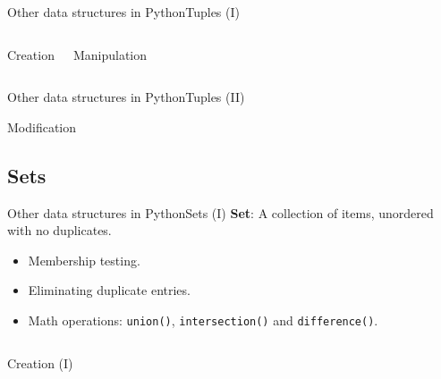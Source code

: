 \documentclass[10pt,compress]{beamer} %
\begin{document}
{\begin{frame}{Other data structures in Python}{Tuples (I)}
	    \begin{columns}
 	   \scriptsize{
		\begin{block}{Creation}
		\vspace{-0.2cm}
		
		\vspace{-0.2cm}
		\end{block}
		}
       \vspace{4cm}
 	   \scriptsize{
		\begin{block}{Manipulation}
		\vspace{-0.2cm}
		
		\vspace{-0.3cm}	
		\end{block}
		}
		\vspace{2.9 cm}

	\end{columns}
\end{frame}

\begin{frame}{Other data structures in Python}{Tuples (II)}
 	  \vspace{-0.2cm}
 	   \tiny{
		\begin{block}{\scriptsize{Modification}}
		
		\vspace{-0.2cm}
		
		\vspace{-0.2cm}
		
		\end{block}
   }
\end{frame}

\subsection{Sets}
\begin{frame}{Other data structures in Python}{Sets (I)}
\vspace{-0.2cm}
	\textbf{Set}: A collection of items, unordered with no duplicates.
		\begin{itemize}
		\item \small{Membership testing.}
		\item \small{Eliminating duplicate entries.}
		\item \small{Math operations: \texttt{union()}, \texttt{intersection()} and \texttt{difference()}.}
		\end{itemize}
\vspace{-0.2cm}
    \begin{columns}
 	   \column{.45\textwidth}
 	   \scriptsize{
		\begin{block}{Creation (I)}
		\vspace{-0.2cm}
		

\end{block}}
\end{columns}
\end{frame}}
\end{document}
